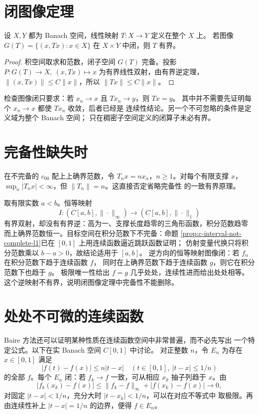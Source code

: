 \section{闭图像定理}

\begin{theorem}\label{thm:closed-graph}
设 \(X,Y\) 都为 Banach 空间，线性映射 \(T:X\to Y\) 定义在整个 \(X\) 上。
若图像 \(G(T)=\{(x,Tx):x\in X\}\) 在 \(X\times Y\) 中闭，则 \(T\) 有界。
\end{theorem}
\begin{proof}
积空间取求和范数，闭子空间 \(G(T)\) 完备。投影
\(P:G(T)\to X,\ (x,Tx)\mapsto x\) 为有界线性双射，由有界逆定理，
\(\|(x,Tx)\|\le C\|x\|\)，所以 \(\|Tx\|\le C\|x\|\)。
\end{proof}

检查图像闭只要求：若 \(x_n\to x\) 且 \(Tx_n\to y\)，则 \(Tx=y\)。
其中并不需要先证明每个 \(x_n\to x\) 都使 \(Tx_n\) 收敛，后者已经是
连续性结论。另一个不可忽略的条件是定义域为整个 Banach 空间；
只在稠密子空间定义的闭算子未必有界。

\section{完备性缺失时}

在不完备的 \(c_{00}\) 配上上确界范数，令 \(T_nx=nx_n\)，\(n\ge1\)。对每个有限支撑
\(x\)，\(\sup_n|T_nx|<\infty\)，但 \(\|T_n\|=n\)。这直接否定省略完备性
的一致有界原理。

取有限实数 \(a<b\)。恒等映射
\[
 I:(C[a,b],\|\cdot\|_\infty)\longrightarrow(C[a,b],\|\cdot\|_1)
\]
有界双射，却没有有界逆：高为一、支撑长度趋零的三角形函数，积分范数趋零
而上确界范数恒一。目标空间在积分范数下不完备：命题
\ref{prop:c-interval-not-complete-l1}已在 \([0,1]\) 上用连续函数逼近跳跃函数证明；
仿射变量代换只将积分范数乘以 \(b-a>0\)，故结论适用于 \([a,b]\)。
逆方向的恒等映射图像闭：若 \(f_n\) 在积分范数下趋于连续函数 \(f\)，
同时在上确界范数下趋于连续函数 \(g\)，则它在积分范数下也趋于 \(g\)。
极限唯一性给出 \(f=g\) 几乎处处，连续性进而给出处处相等。
这个逆映射不有界，说明闭图像定理中完备性不能删除。

\section{处处不可微的连续函数}

Baire 方法还可以证明某种性质在连续函数空间中非常普遍，而不必先写出
一个特定公式。以下在实 Banach 空间 \(C[0,1]\) 中讨论。
对正整数 \(n\)，令 \(E_n\) 为存在 \(x\in[0,1]\) 满足
\[
 |f(t)-f(x)|\le n|t-x|\quad
 (t\in[0,1],\ |t-x|\le1/n)
\]
的全部 \(f\)。每个 \(E_n\) 闭：若 \(f_k\to f\) 一致，可从相应 \(x_k\)
抽子列趋于 \(x\)。由
\[
 |f_k(x_k)-f(x)|\le\|f_k-f\|_\infty+|f(x_k)-f(x)|\longrightarrow0,
\]
对固定 \(|t-x|<1/n\)，充分大时 \(|t-x_k|<1/n\)，可以在对应不等式中
取极限。再由连续性补上 \(|t-x|=1/n\) 的边界，便得 \(f\in E_n\)。

